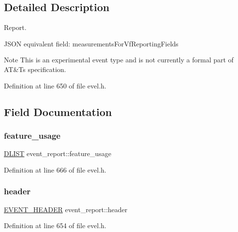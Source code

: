 \subsection{Detailed Description}
Report. 

J\+S\+ON equivalent field\+: measurements\+For\+Vf\+Reporting\+Fields

\begin{DoxyNote}{Note}
This is an experimental event type and is not currently a formal part of AT\&T\textquotesingle{}s specification. 
\end{DoxyNote}


Definition at line 650 of file evel.\+h.



\subsection{Field Documentation}
\hypertarget{structevent__report_abb6a555e0bf695531258a22286826cc2}{}\label{structevent__report_abb6a555e0bf695531258a22286826cc2} 
\subsubsection{\texorpdfstring{feature\+\_\+usage}{feature\_usage}}
{\footnotesize\ttfamily \hyperlink{double__list_8h_a45f4a129042d9e1aa4ffd31fe13e4d14}{D\+L\+I\+ST} event\+\_\+report\+::feature\+\_\+usage}



Definition at line 666 of file evel.\+h.

\hypertarget{structevent__report_a7f9683ffdfa96c3c82913f7f60e95abb}{}\label{structevent__report_a7f9683ffdfa96c3c82913f7f60e95abb} 
\subsubsection{\texorpdfstring{header}{header}}
{\footnotesize\ttfamily \hyperlink{evel_8h_aa0ea94c675729365ea7825c4fc7e06d8}{E\+V\+E\+N\+T\+\_\+\+H\+E\+A\+D\+ER} event\+\_\+report\+::header}



Definition at line 654 of file evel.\+h.

\hypertarget{structevent__report_a3ae8eebdad88e69dad8e943b8d6d12c2}{}\label{structevent__report_a3ae8eebdad88e69dad8e943b8d6d12c2} 
